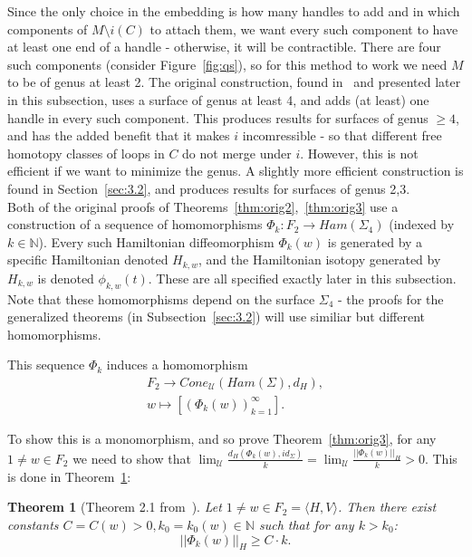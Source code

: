 \documentclass[11pt]{article}
\newenvironment{myequation}
    {
        \begin{equation*}
        \begin{gathered}
    }
    { 
        \end{gathered} 
        \end{equation*}
    }
\newtheorem{theorem}{Theorem}[section]
\newcommand{\N}{\mathbb{N}}
\begin{document}
            Since the only choice in the embedding is how many handles to add and in which components of $M \setminus i(C)$ to attach them, we want every such component to have at least one end of a handle - otherwise, it will be contractible. There are four such components (consider Figure~\ref{fig:qs}), so for this method to work we need $M$ to be of genus at least 2. The original construction, found in~\cite{PS14} and presented later in this subsection, uses a surface of genus at least 4, and adds (at least) one handle in every such component. This produces results for surfaces of genus $\geq 4$, and has the added benefit that it makes $i$ incomressible - so that different free homotopy classes of loops in $C$ do not merge under $i$. However, this is not efficient if we want to minimize the genus. A slightly more efficient construction is found in Section~\ref{sec:3.2}, and produces results for surfaces of genus 2,3. \\
            
    
            
            Both of the original proofs of Theorems~\ref{thm:orig2},~\ref{thm:orig3} use a construction of a sequence of homomorphisms $\Phi_k: F_2 \to Ham(\Sigma_4)$ (indexed by $k \in \N$). Every such Hamiltonian diffeomorphism $\Phi_k(w)$ is generated by a specific Hamiltonian denoted $H_{k,w}$, and the Hamiltonian isotopy generated by $H_{k,w}$ is denoted $\phi_{k,w}(t)$. These are all specified exactly later in this subsection. Note that these homomorphisms depend on the surface $\Sigma_4$ - the proofs for the generalized theorems (in Subsection~\ref{sec:3.2}) will use similiar but different homomorphisms.
            
            This sequence $\Phi_k$ induces a homomorphism
            \begin{myequation}
                F_2 \to Cone_\mathcal{U}(Ham(\Sigma), d_H) , \\
                w \mapsto [(\Phi_k(w))_{k=1}^\infty] .
            \end{myequation}
            
            To show this is a monomorphism, and so prove Theorem~\ref{thm:orig3}, for any $1 \neq w \in F_2$ we need to show that $\lim_\mathcal{U} \frac{d_H(\Phi_k(w), id_\Sigma)}{k} = \lim_\mathcal{U} \frac{|| \Phi_k(w) ||_H}{k} > 0$. This is done in Theorem~\ref{thm:4}:
            
            \begin{theorem}[Theorem 2.1 from~\cite{10}]
            \label{thm:4}
                Let $1 \neq w \in F_2 = \langle H,V \rangle$. Then there exist constants $C = C(w) > 0, k_0 = k_0(w) \in \N$ such that for any $k > k_0$:
                \[
                    || \Phi_k(w) ||_H \geq C \cdot k.
                \]
            \end{theorem}
            
\end{document}
